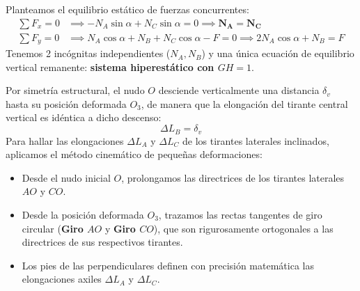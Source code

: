 {\begin{center}
{%
        }
    \end{center}

    Planteamos el equilibrio estático de fuerzas concurrentes:
    \begin{align}
        \sum F_x = 0 & \implies -N_A \sin \alpha + N_C \sin \alpha = 0 \implies \mathbf{N_A = N_C}                   \\
        \sum F_y = 0 & \implies N_A \cos \alpha + N_B + N_C \cos \alpha - F = 0 \implies 2 N_A \cos \alpha + N_B = F
    \end{align}
    Tenemos 2 incógnitas independientes ($N_A, N_B$) y una única ecuación de equilibrio vertical remanente: \textbf{sistema hiperestático con $GH = 1$}.


    Por simetría estructural, el nudo $O$ desciende verticalmente una distancia $\delta_v$ hasta su posición deformada $O_3$, de manera que la elongación del tirante central vertical es idéntica a dicho descenso:
    \begin{equation}
        \Delta L_B = \delta_v
    \end{equation}
    Para hallar las elongaciones $\Delta L_A$ y $\Delta L_C$ de los tirantes laterales inclinados, aplicamos el método cinemático de pequeñas deformaciones:
    \begin{itemize}
        \item Desde el nudo inicial $O$, prolongamos las directrices de los tirantes laterales $AO$ y $CO$.
        \item Desde la posición deformada $O_3$, trazamos las rectas tangentes de giro circular (\textbf{Giro $AO$} y \textbf{Giro $CO$}), que son rigurosamente ortogonales a las directrices de sus respectivos tirantes.
        \item Los pies de las perpendiculares definen con precisión matemática las elongaciones axiles $\Delta L_A$ y $\Delta L_C$.
    \end{itemize}

}
